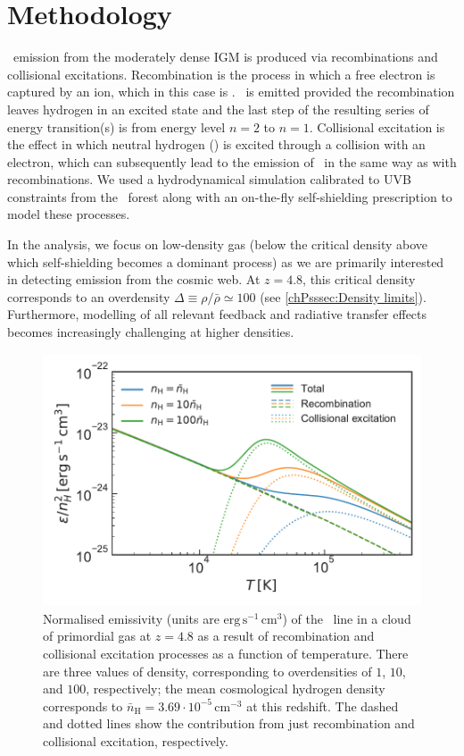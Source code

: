 \section{Methodology}
\label{chPsec:Methodology}

\lya\ emission from the moderately dense IGM is produced via recombinations and collisional excitations. Recombination is the process in which a free electron is captured by an ion, which in this case is . \lya\ is emitted provided the recombination leaves hydrogen in an excited state and the last step of the resulting series of energy transition(s) is from energy level $n=2$ to $n=1$. Collisional excitation is the effect in which neutral hydrogen () is excited through a collision with an electron, which can subsequently lead to the emission of \lya\ in the same way as with recombinations. We used a hydrodynamical simulation calibrated to UVB constraints from the \lya\ forest along with an on-the-fly self-shielding prescription to model these processes.

In the analysis, we focus on low-density gas (below the critical density above which self-shielding becomes a dominant process) as we are primarily interested in detecting emission from the cosmic web. At $z=4.8$, this critical density corresponds to an overdensity $\Delta \equiv \rho/\bar{\rho} \simeq 100$ (see \cref{chPsssec:Density limits}). Furthermore, modelling of all relevant feedback and radiative transfer effects becomes increasingly challenging at higher densities.
\begin{figure}
    \centering
    \includegraphics[width=0.6\linewidth]{"Plots/ChapterP/Theoretical_emissivity"}
    \caption[Theoretical \lya\ emissivity as a function of temperature]
    {Normalised emissivity (units are $\mathrm{erg \, s^{-1} \, cm^3}$) of the \lya\ line in a cloud of primordial gas at $z=4.8$ as a result of recombination and collisional excitation processes as a function of temperature. There are three values of density, corresponding to overdensities of $1$, $10$, and $100$, respectively; the mean cosmological hydrogen density corresponds to $\bar{n}_\text{H} = 3.69 \cdot 10^{-5} \, \mathrm{cm^{-3}}$ at this redshift. The dashed and dotted lines show the contribution from just recombination and collisional excitation, respectively.}
    \label{chPfig:Emissivity theoretical}
\end{figure}

